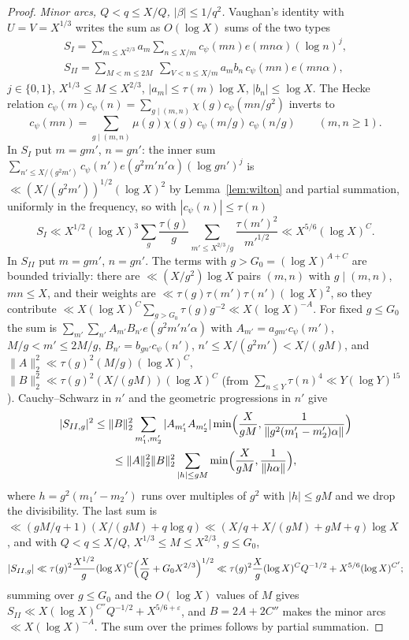 ﻿\documentclass[11pt]{amsart}
\theoremstyle{remark}
\newcommand{\e}{\varepsilon}
\begin{document}
\begin{proof}
\emph{Minor arcs, $Q<q\le X/Q$, $|\beta|\le1/q^2$.} Vaughan's identity with $U=V=X^{1/3}$ \cite[Chapter~24]{Davenport} writes the sum as $O(\log X)$ sums of the two types
\begin{gather*}
S_I=\sum_{m\le X^{2/3}}a_m\sum_{n\le X/m}c_\psi(mn)e(mn\alpha)(\log n)^j,\\ S_{II}=\sum_{M<m\le2M}\ \sum_{V<n\le X/m}a_mb_n\,c_\psi(mn)e(mn\alpha),
\end{gather*}
$j\in\{0,1\}$, $X^{1/3}\le M\le X^{2/3}$, $|a_m|\le\tau(m)\log X$, $|b_n|\le\log X$. The Hecke relation $c_\psi(m)c_\psi(n)=\sum_{g\mid(m,n)}\chi(g)c_\psi(mn/g^2)$ inverts to
\begin{equation}\label{eq:hecke}
c_\psi(mn)=\sum_{g\mid(m,n)}\mu(g)\chi(g)\,c_\psi(m/g)\,c_\psi(n/g)\qquad(m,n\ge1).
\end{equation}
In $S_I$ put $m=gm'$, $n=gn'$: the inner sum $\sum_{n'\le X/(g^2m')}c_\psi(n')e(g^2m'n'\alpha)(\log gn')^j$ is $\ll(X/(g^2m'))^{1/2}(\log X)^2$ by Lemma~\ref{lem:wilton} and partial summation, uniformly in the frequency, so with $|c_\psi(n)|\le\tau(n)$
\[
S_I\ll X^{1/2}(\log X)^3\sum_g\frac{\tau(g)}g\sum_{m'\le X^{2/3}/g}\frac{\tau(m')^2}{m'^{1/2}}\ll X^{5/6}(\log X)^C.
\]
In $S_{II}$ put $m=gm'$, $n=gn'$. The terms with $g>G_0=(\log X)^{A+C}$ are bounded trivially: there are $\ll(X/g^2)\log X$ pairs $(m,n)$ with $g\mid(m,n)$, $mn\le X$, and their weights are $\ll\tau(g)\tau(m')\tau(n')(\log X)^2$, so they contribute $\ll X(\log X)^{C}\sum_{g>G_0}\tau(g)g^{-2}\ll X(\log X)^{-A}$. For fixed $g\le G_0$ the sum is $\sum_{m'}\sum_{n'}A_{m'}B_{n'}e(g^2m'n'\alpha)$ with $A_{m'}=a_{gm'}c_\psi(m')$, $M/g<m'\le2M/g$, $B_{n'}=b_{gn'}c_\psi(n')$, $n'\le X/(g^2m')<X/(gM)$, and $\|A\|_2^2\ll\tau(g)^2(M/g)(\log X)^C$, $\|B\|_2^2\ll\tau(g)^2(X/(gM))(\log X)^C$ (from $\sum_{n\le Y}\tau(n)^4\ll Y(\log Y)^{15}$). Cauchy--Schwarz in $n'$ and the geometric progressions in $n'$ give
\begin{multline*}
|S_{II,g}|^2\le\|B\|_2^2\sum_{m_1',m_2'}|A_{m_1'}A_{m_2'}|\min\Bigl(\frac X{gM},\frac1{\|g^2(m_1'-m_2')\alpha\|}\Bigr)\\
\le\|A\|_2^2\|B\|_2^2\sum_{|h|\le gM}\min\Bigl(\frac X{gM},\frac1{\|h\alpha\|}\Bigr),
\end{multline*}
where $h=g^2(m_1'-m_2')$ runs over multiples of $g^2$ with $|h|\le gM$ and we drop the divisibility. The last sum is $\ll(gM/q+1)(X/(gM)+q\log q)\ll(X/q+X/(gM)+gM+q)\log X$ \cite[Chapter~25]{Davenport}, and with $Q<q\le X/Q$, $X^{1/3}\le M\le X^{2/3}$, $g\le G_0$,
\[
|S_{II,g}|\ll\tau(g)^2\frac{X^{1/2}}g(\log X)^C\Bigl(\frac XQ+G_0X^{2/3}\Bigr)^{1/2}\ll\tau(g)^2\frac Xg(\log X)^CQ^{-1/2}+X^{5/6}(\log X)^{C'};
\]
summing over $g\le G_0$ and the $O(\log X)$ values of $M$ gives $S_{II}\ll X(\log X)^{C''}Q^{-1/2}+X^{5/6+\e}$, and $B=2A+2C''$ makes the minor arcs $\ll X(\log X)^{-A}$. The sum over the primes follows by partial summation.
\end{proof}
\end{document}
